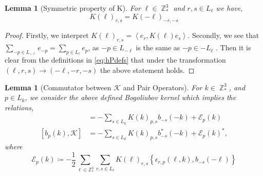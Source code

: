 \documentclass[sn-mathphys, Numbered ,a4paper]{sn-jnl}%
\DeclareMathOperator{\Z}{\mathbb{Z}}
\newcommand{\half}{\frac{1}{2}}
\newcommand{\eva}[1]{\left\langle #1 \right\rangle}
\theoremstyle{plain}
\newtheorem{lemma}[theorem]{Lemma}
\theoremstyle{definition}
\theoremstyle{remark}
\theoremstyle{plain}
\theoremstyle{definition}
\theoremstyle{remark}
\begin{document}
\begin{lemma}[Symmetric property of K]
    For $\ell \in \Z^3_*$ and $r,s \in L_{\ell}$ we have,
    \begin{equation}
        K(\ell)_{r,s} = K(-\ell)_{-r,-s}
    \end{equation}
\end{lemma}
\begin{proof}
    Firstly, we interpret $K(\ell)_{r,s} = \eva{e_r, K(\ell)e_s}$. Secondly, we see that $\sum_{-p \in L_{-\ell}}e_{-p} = \sum_{p \in L_{\ell}}e_{p} $, as $-p \in L_{-\ell}$ is the same as $-p \in -L_{\ell}$ . Then it is clear from the definitions in \eqref{eq:hPdefs} that under the transformation $(\ell,r,s)\rightarrow(-\ell,-r,-s)$ the above statement holds. 
\end{proof}
\begin{lemma}[Commutator between $\mathcal{K} $ and Pair Operators]
For $k \in \Z^3_*$, and $p \in L_{k}$, we consider the above defined Bogoliubov kernel which implies the relations,
\begin{align}
    [b^*_p(k),\mathcal{K}] &=-\sum\limits_{s\in L_{k}}K(k)_{p,s}b_{-s}(-k) + \mathcal{E}_{p}(k)\label{eq:13} \\
    [b_p(k),\mathcal{K}] &=-\sum\limits_{s\in L_{k}}K(k)_{p,s}b^*_{-s}(-k) + \mathcal{E}_{p}(k)^*\label{eq:14},
\end{align}
    where
\begin{equation}\label{eq:commerrKb}
    \mathcal{E}_{p}(k) \coloneq -\frac{1}{2}\sum\limits_{\ell\in \mathbb{Z}^3_*}\sum\limits_{r,s\in L_\ell}K(\ell)_{r,s}\left\{\epsilon_{r,p}(\ell,k),b_{-s}(-\ell)\right\} 
\end{equation}
\end{lemma}
\end{document}
